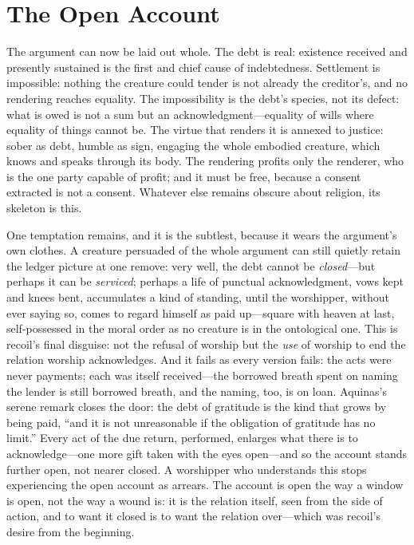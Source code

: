 \section{The Open Account}

The argument can now be laid out whole. The debt is real: existence received and presently sustained is the first and chief cause of indebtedness. Settlement is impossible: nothing the creature could tender is not already the creditor's, and no rendering reaches equality. The impossibility is the debt's species, not its defect: what is owed is not a sum but an acknowledgment---equality of wills where equality of things cannot be. The virtue that renders it is annexed to justice: sober as debt, humble as sign, engaging the whole embodied creature, which knows and speaks through its body. The rendering profits only the renderer, who is the one party capable of profit; and it must be free, because a consent extracted is not a consent. Whatever else remains obscure about religion, its skeleton is this.

One temptation remains, and it is the subtlest, because it wears the argument's own clothes. A creature persuaded of the whole argument can still quietly retain the ledger picture at one remove: very well, the debt cannot be \emph{closed}---but perhaps it can be \emph{serviced}; perhaps a life of punctual acknowledgment, vows kept and knees bent, accumulates a kind of standing, until the worshipper, without ever saying so, comes to regard himself as paid up---square with heaven at last, self-possessed in the moral order as no creature is in the ontological one. This is recoil's final disguise: not the refusal of worship but the \emph{use} of worship to end the relation worship acknowledges. And it fails as every version fails: the acts were never payments; each was itself received---the borrowed breath spent on naming the lender is still borrowed breath, and the naming, too, is on loan. Aquinas's serene remark closes the door: the debt of gratitude is the kind that grows by being paid, ``and it is not unreasonable if the obligation of gratitude has no limit.'' Every act of the due return, performed, enlarges what there is to acknowledge---one more gift taken with the eyes open---and so the account stands further open, not nearer closed. A worshipper who understands this stops experiencing the open account as arrears. The account is open the way a window is open, not the way a wound is: it is the relation itself, seen from the side of action, and to want it closed is to want the relation over---which was recoil's desire from the beginning.

